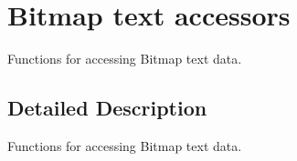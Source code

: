 \hypertarget{group____accessors__bmptext}{\section{Bitmap text accessors}
\label{group____accessors__bmptext}
}


Functions for accessing Bitmap text data.  




\subsection{Detailed Description}
Functions for accessing Bitmap text data. 